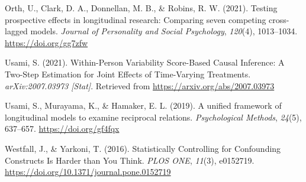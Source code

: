 \documentclass[
  english,
  man,floatsintext]{apa6}
\newlength{\cslhangindent}
\newlength{\cslentryspacingunit} %
\newenvironment{CSLReferences}[2] %
 {%
  \setlength{\parindent}{0pt}
  \ifodd #1
  \let\oldpar\par
  \def\par{\hangindent=\cslhangindent\oldpar}
  \fi
  \setlength{\parskip}{#2\cslentryspacingunit}
 }%
 {}
\begin{document}
\begin{CSLReferences}{1}{0}
\leavevmode{}%
Orth, U., Clark, D. A., Donnellan, M. B., \& Robins, R. W. (2021). Testing prospective effects in longitudinal research: {Comparing} seven competing cross-lagged models. \emph{Journal of Personality and Social Psychology}, \emph{120}(4), 1013--1034. \url{https://doi.org/gg7zfw}

\leavevmode{}%
Usami, S. (2021). Within-{Person Variability Score-Based Causal Inference}: {A Two-Step Estimation} for {Joint Effects} of {Time-Varying Treatments}. \emph{arXiv:2007.03973 {[}Stat{]}}. Retrieved from \url{https://arxiv.org/abs/2007.03973}

\leavevmode{}%
Usami, S., Murayama, K., \& Hamaker, E. L. (2019). A unified framework of longitudinal models to examine reciprocal relations. \emph{Psychological Methods}, \emph{24}(5), 637--657. \url{https://doi.org/gf4fqx}

\leavevmode{}%
Westfall, J., \& Yarkoni, T. (2016). Statistically {Controlling} for {Confounding Constructs Is Harder} than {You Think}. \emph{PLOS ONE}, \emph{11}(3), e0152719. \url{https://doi.org/10.1371/journal.pone.0152719}

\end{CSLReferences}
\end{document}
